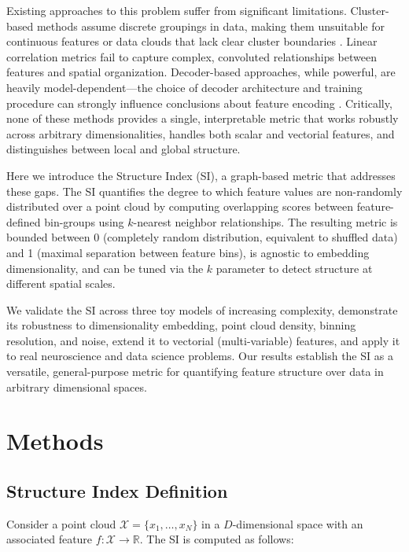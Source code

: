 \documentclass[12pt]{article}
\begin{document}
Existing approaches to this problem suffer from significant limitations. Cluster-based methods assume discrete groupings in data, making them unsuitable for continuous features or data clouds that lack clear cluster boundaries \citep{von2007tutorial}. Linear correlation metrics fail to capture complex, convoluted relationships between features and spatial organization. Decoder-based approaches, while powerful, are heavily model-dependent---the choice of decoder architecture and training procedure can strongly influence conclusions about feature encoding \citep{glaser2020machine}. Critically, none of these methods provides a single, interpretable metric that works robustly across arbitrary dimensionalities, handles both scalar and vectorial features, and distinguishes between local and global structure.

Here we introduce the Structure Index (SI), a graph-based metric that addresses these gaps. The SI quantifies the degree to which feature values are non-randomly distributed over a point cloud by computing overlapping scores between feature-defined bin-groups using $k$-nearest neighbor relationships. The resulting metric is bounded between 0 (completely random distribution, equivalent to shuffled data) and 1 (maximal separation between feature bins), is agnostic to embedding dimensionality, and can be tuned via the $k$ parameter to detect structure at different spatial scales.

We validate the SI across three toy models of increasing complexity, demonstrate its robustness to dimensionality embedding, point cloud density, binning resolution, and noise, extend it to vectorial (multi-variable) features, and apply it to real neuroscience and data science problems. Our results establish the SI as a versatile, general-purpose metric for quantifying feature structure over data in arbitrary dimensional spaces.

\section{Methods}

\subsection{Structure Index Definition}

Consider a point cloud $\mathcal{X} = \{x_1, \ldots, x_N\}$ in a $D$-dimensional space with an associated feature $f: \mathcal{X} \rightarrow \mathbb{R}$. The SI is computed as follows:
\end{document}
